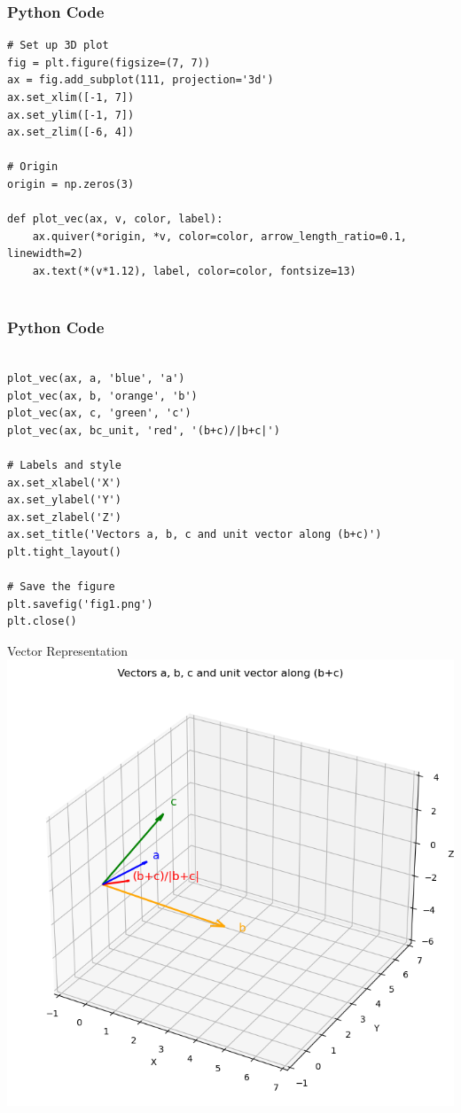 \documentclass{beamer}
\begin{document}
\begin{frame}[fragile]
    \frametitle{Python Code}
    \begin{lstlisting}
# Set up 3D plot
fig = plt.figure(figsize=(7, 7))
ax = fig.add_subplot(111, projection='3d')
ax.set_xlim([-1, 7])
ax.set_ylim([-1, 7])
ax.set_zlim([-6, 4])

# Origin
origin = np.zeros(3)

def plot_vec(ax, v, color, label):
    ax.quiver(*origin, *v, color=color, arrow_length_ratio=0.1, linewidth=2)
    ax.text(*(v*1.12), label, color=color, fontsize=13)
  
    \end{lstlisting}
\end{frame}


\begin{frame}[fragile]
    \frametitle{Python Code}
    \begin{lstlisting}
    
plot_vec(ax, a, 'blue', 'a')
plot_vec(ax, b, 'orange', 'b')
plot_vec(ax, c, 'green', 'c')
plot_vec(ax, bc_unit, 'red', '(b+c)/|b+c|')

# Labels and style
ax.set_xlabel('X')
ax.set_ylabel('Y')
ax.set_zlabel('Z')
ax.set_title('Vectors a, b, c and unit vector along (b+c)')
plt.tight_layout()

# Save the figure
plt.savefig('fig1.png')
plt.close()  

    \end{lstlisting}
\end{frame}


\begin{frame}{Vector Representation}
   \centering
    \includegraphics[width=\columnwidth, height=0.8\textheight, keepaspectratio]{figs/fig1.png}
    \label{fig:Beamer/figs/fig1.png}
\end{frame}
\end{document}
